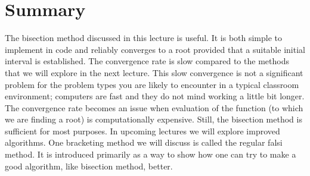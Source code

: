 \section{Summary}
The bisection method discussed in this lecture is useful.  It is both simple to implement in code and reliably converges to a root provided that a suitable initial interval is established.  The convergence rate is slow compared to the methods that we will explore in the next lecture. This slow convergence is not a significant problem for the problem types you are likely to encounter in a typical classroom environment; computers are fast and they do not mind working a little bit longer.  The convergence rate becomes an issue when evaluation of the function (to which we are finding a root) is computationally expensive.  Still, the bisection method is sufficient for most purposes.  In upcoming lectures we will explore improved algorithms.  One bracketing method we will discuss is called the regular falsi method.  It is introduced primarily as a way to show how one can try to make a good algorithm, like bisection method, better.
